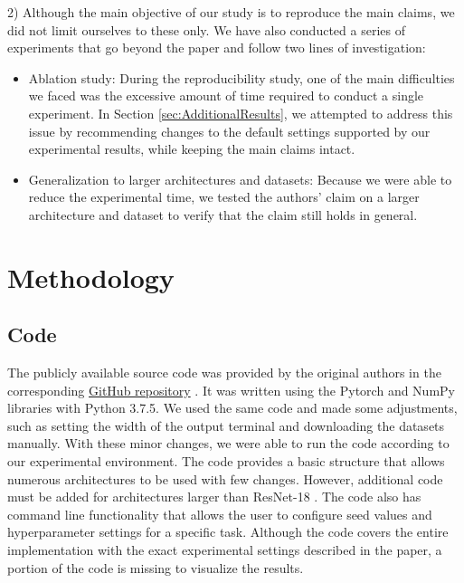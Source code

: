 2) Although the main objective of our study is to reproduce the main claims, we did not limit ourselves to these only. We have also conducted a series of experiments that go beyond the paper and follow two lines of investigation:
\begin{itemize}
    \item Ablation study: During the reproducibility study, one of the main difficulties we faced was the excessive amount of time required to conduct a single experiment. In Section \ref{sec:AdditionalResults}, we attempted to address this issue by recommending changes to the default settings supported by our experimental results, while keeping the main claims intact.
    \item Generalization to larger architectures and datasets: Because we were able to reduce the experimental time, we tested the authors' claim on a larger architecture and dataset to verify that the claim still holds in general.
\end{itemize}


\section{Methodology}
\label{sec:Methodology}
\subsection{Code}
The publicly available source code was provided by the original authors in the corresponding \href{https://github.com/ceciliaresearch/nondeterminism_instability}{GitHub repository} . It was written using the Pytorch \citep{paszke2019pytorch} and NumPy libraries with Python 3.7.5. We used the same code and made some adjustments, such as setting the width of the output terminal and downloading the datasets manually. With these minor changes, we were able to run the code according to our experimental environment. The code provides a basic structure that allows numerous architectures to be used with few changes. However, additional code must be added for architectures larger than ResNet-18 \citep{he2016deep}. The code also has command line functionality that allows the user to configure seed values and hyperparameter settings for a specific task. Although the code covers the entire implementation with the exact experimental settings described in the paper, a portion of the code is missing to visualize the results.
